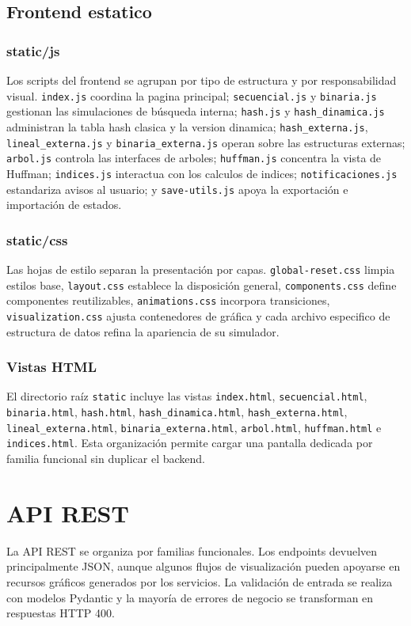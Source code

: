 \documentclass[12pt,onecolumn]{IEEEtran}
\begin{document}
\subsection{Frontend estatico}
\subsubsection{static/js}
Los scripts del frontend se agrupan por tipo de estructura y por responsabilidad visual. \texttt{index.js} coordina la pagina principal; \texttt{secuencial.js} y \texttt{binaria.js} gestionan las simulaciones de búsqueda interna; \texttt{hash.js} y \texttt{hash\_dinamica.js} administran la tabla hash clasica y la version dinamica; \texttt{hash\_externa.js}, \texttt{lineal\_externa.js} y \texttt{binaria\_externa.js} operan sobre las estructuras externas; \texttt{arbol.js} controla las interfaces de arboles; \texttt{huffman.js} concentra la vista de Huffman; \texttt{indices.js} interactua con los calculos de indices; \texttt{notificaciones.js} estandariza avisos al usuario; y \texttt{save-utils.js} apoya la exportación e importación de estados.

\subsubsection{static/css}
Las hojas de estilo separan la presentación por capas. \texttt{global-reset.css} limpia estilos base, \texttt{layout.css} establece la disposición general, \texttt{components.css} define componentes reutilizables, \texttt{animations.css} incorpora transiciones, \texttt{visualization.css} ajusta contenedores de gráfica y cada archivo especifico de estructura de datos refina la apariencia de su simulador.

\subsubsection{Vistas HTML}
El directorio raíz \texttt{static} incluye las vistas \texttt{index.html}, \texttt{secuencial.html}, \texttt{binaria.html}, \texttt{hash.html}, \texttt{hash\_dinamica.html}, \texttt{hash\_externa.html}, \texttt{lineal\_externa.html}, \texttt{binaria\_externa.html}, \texttt{arbol.html}, \texttt{huffman.html} e \texttt{indices.html}. Esta organización permite cargar una pantalla dedicada por familia funcional sin duplicar el backend.

\section{API REST}
La API REST se organiza por familias funcionales. Los endpoints devuelven principalmente JSON, aunque algunos flujos de visualización pueden apoyarse en recursos gráficos generados por los servicios. La validación de entrada se realiza con modelos Pydantic y la mayoría de errores de negocio se transforman en respuestas HTTP 400.
\end{document}
